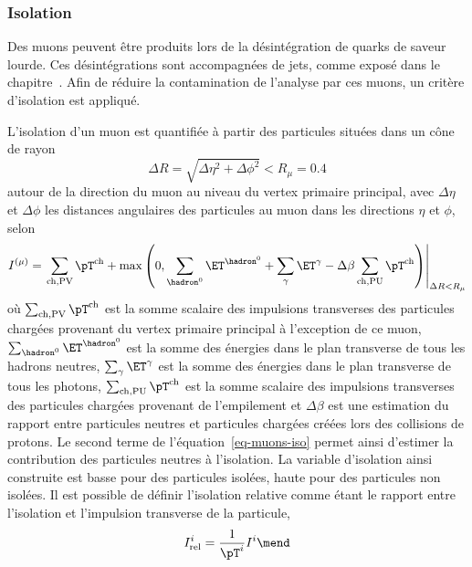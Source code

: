 \subsubsection{Isolation}\label{chapter-HTT_analysis-section-objects-muons-iso}
Des muons peuvent être produits lors de la désintégration de quarks de saveur lourde.
Ces désintégrations sont accompagnées de jets, comme exposé dans le chapitre~.
Afin de réduire la contamination de l'analyse par ces muons, un critère d'isolation est appliqué.
\par
L'isolation d'un muon est quantifiée à partir des particules situées dans un cône de rayon
\begin{equation}
\Delta R = \sqrt{\Delta\eta^2+\Delta\phi^2} < R_\mu=\num{0.4}
\end{equation}
autour de la direction du muon au niveau du vertex primaire principal,
avec $\Delta\eta$ et $\Delta\phi$ les distances angulaires des particules au muon dans les directions $\eta$ et $\phi$,
selon
\begin{equation}
I^{(\mu)}
=
\left.
\sum_{\text{ch},\text{PV}} \pT^{\text{ch}}
+
\max\left(
0
,
\sum_{\hadron^0}\ET^{\hadron^0}
+
\sum_{\gamma}\ET^{\gamma}
- \Delta\beta
\sum_{\text{ch},\text{PU}} \pT^{\text{ch}}
\right)
\right|_{\Delta R < R_\mu}
\label{eq-muons-iso}
\end{equation}
où
$\sum_{\text{ch},\text{PV}} \pT^{\text{ch}}$ est la somme scalaire des impulsions transverses des particules chargées provenant du vertex primaire principal à l'exception de ce muon,
$\sum_{\hadron^0}\ET^{\hadron^0}$ est la somme des énergies dans le plan transverse de tous les hadrons neutres,
$\sum_{\gamma}\ET^{\gamma}$ est la somme des énergies dans le plan transverse de tous les photons,
$\sum_{\text{ch},\text{PU}} \pT^{\text{ch}}$ est la somme scalaire des impulsions transverses des particules chargées provenant de l'empilement et
$\Delta\beta$ est une estimation du rapport entre particules neutres et particules chargées créées lors des collisions de protons.
Le second terme de l'équation~\eqref{eq-muons-iso} permet ainsi d'estimer la contribution des particules neutres à l'isolation.
La variable d'isolation ainsi construite est basse pour des particules isolées, haute pour des particules non isolées.
Il est possible de définir l'isolation relative comme étant le rapport entre l'isolation et l'impulsion transverse de la particule,
\begin{equation}
I_\text{rel}^{i}
=
\frac{1}{\pT^{i}}
I^{i}
\mend
\label{eq-muons-reliso}
\end{equation}